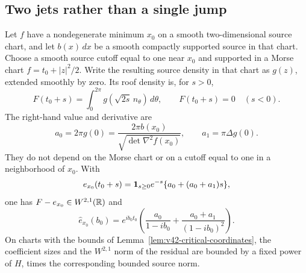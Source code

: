 \subsection{Two jets rather than a single jump}
\begin{lemma}
\label{lem:v42-two-jet}
Let $f$ have a nondegenerate minimum $x_0$ on a smooth two-dimensional
source chart, and let $b(x)\,dx$ be a smooth compactly supported source
in that chart. Choose a smooth source cutoff equal to one near $x_0$
and supported in a Morse chart $f=t_0+|z|^2/2$. Write the resulting
source density in that chart as $g(z)$, extended smoothly by zero.
Its roof density is, for $s>0$,
\[
 F(t_0+s)=\int_0^{2\pi}g(\sqrt{2s}\,n_\theta)\,d\theta,
 \qquad F(t_0+s)=0\quad(s<0).
\]
The right-hand value and derivative are
\begin{equation}\label{eq:v42-edge-jets}
 a_0=2\pi g(0)=\frac{2\pi b(x_0)}{\sqrt{\det\nabla^2f(x_0)}},
 \qquad a_1=\pi\Delta g(0).
\end{equation}
They do not depend on the Morse chart or on a cutoff equal to one in
a neighborhood of $x_0$. With
\begin{equation}\label{eq:v42-rational-edge}
 e_{x_0}(t_0+s)
   =\one_{s\ge0}e^{-s}\{a_0+(a_0+a_1)s\},
\end{equation}
one has $F-e_{x_0}\in W^{2,1}(\mathbb R)$ and
\begin{equation}\label{eq:v42-rational-edge-transform}
 \widehat e_{x_0}(b_0)=e^{ib_0t_0}
       \left(\frac{a_0}{1-ib_0}
                    +\frac{a_0+a_1}{(1-ib_0)^2}\right).
\end{equation}
On charts with the bounds of Lemma~\ref{lem:v42-critical-coordinates},
the coefficient sizes and the $W^{2,1}$ norm of the residual are bounded
by a fixed power of $H$, times the corresponding bounded source norm.
\end{lemma}
